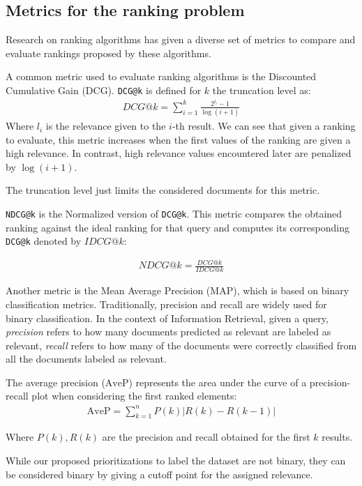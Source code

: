 \subsection{Metrics for the ranking problem}\label{s:bg-rnk-metrics}
Research on ranking algorithms has given a diverse set of metrics to compare and evaluate
rankings proposed by these algorithms. 

A common metric used to evaluate ranking algorithms is the Discounted Cumulative Gain (DCG).
\texttt{DCG@k} is defined for $k$ the truncation level as:
\begin{align*}
DCG@k = \sum_{i=1}^{k}\frac{2^{l_i}-1}{\log(i+1)}
\end{align*}
Where $l_i$ is the relevance given to the $i$-th result. We can see that given a ranking to evaluate, this metric increases
when the first values of the ranking are given a high relevance. In contrast, high relevance values encountered later are 
penalized by $\log(i+1)$.

The truncation level just limits the considered documents for this metric.

\texttt{NDCG@k} is the Normalized version of \texttt{DCG@k}. This metric compares the obtained ranking against
the ideal ranking for that query and computes its corresponding \texttt{DCG@k} denoted by $IDCG@k$:

\begin{align*}
NDCG@k = \frac{DCG@k}{IDCG@k}
\end{align*}

Another metric is the Mean Average Precision (MAP), which is based on binary classification metrics. Traditionally,
precision and recall are widely used for binary classification. In the context of
Information Retrieval, given a query, \emph{precision} refers to how many documents predicted as relevant
are labeled as relevant, \emph{recall} refers to how many of the documents were correctly
classified from all the documents labeled as relevant.

The average precision ($\text{AveP}$) represents the area under the curve of a precision-recall
plot when considering the first ranked elements:
\begin{align*}
\text{AveP} = \sum_{k=1}^{n} P(k)|R(k)-R(k-1)|
\end{align*}

Where $P(k), R(k)$ are the precision and recall obtained for the first $k$ results.

While our proposed prioritizations to label the dataset are not binary,
they can be considered binary by giving a cutoff point for the assigned relevance.

